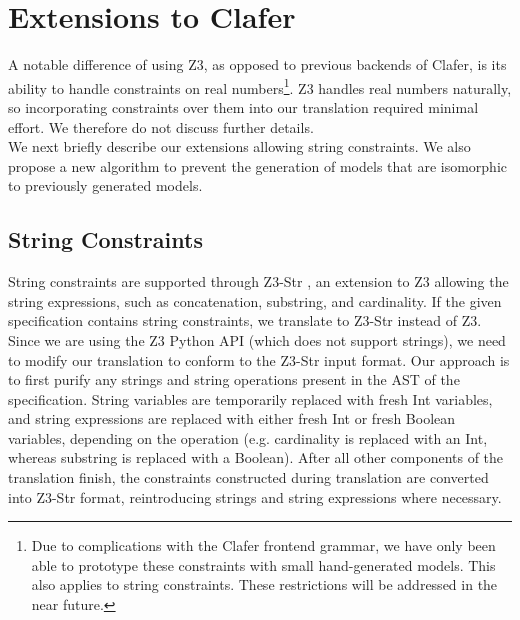 \documentclass{easychair}
\begin{document}
\section{Extensions to Clafer}
A notable difference of using Z3, as opposed to previous backends of Clafer, is its ability to handle constraints on real numbers\footnote{Due to complications with the Clafer frontend grammar, we have only been able to prototype these constraints with small hand-generated models. This also applies to string constraints. These restrictions will be addressed in the near future.}. Z3 handles real numbers naturally, so incorporating constraints over them into our translation required minimal effort. We therefore do not discuss further details. \\
\indent We next briefly describe our extensions allowing string constraints. We also propose a new algorithm to prevent the generation of models that are isomorphic to previously generated models.

\subsection{String Constraints}
String constraints are supported through Z3-Str \cite{Zheng2013}, an extension to Z3 allowing the string expressions, such as concatenation, substring, and cardinality. If the given specification contains string constraints, we translate to Z3-Str instead of Z3. \\
\indent Since we are using the Z3 Python API (which does not support strings), we need to modify our translation to conform to the Z3-Str input format. Our approach is to first purify any strings and string operations present in the AST of the specification. String variables are temporarily replaced with fresh Int variables, and string expressions are replaced with either fresh Int or fresh Boolean variables, depending on the operation (e.g. cardinality is replaced with an Int, whereas substring is replaced with a Boolean). After all other components of the translation finish, the constraints constructed during translation are converted into Z3-Str format, reintroducing strings and string expressions where necessary.

\begin{figure}[!t]
\centering

\end{figure}
\end{document}
